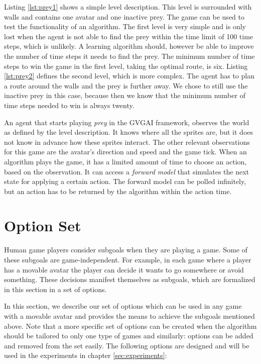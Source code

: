 Listing \ref{lst:prey1} shows a simple level description. This level is
surrounded with walls and contains one avatar and one inactive prey. 
The game can be used to test the functionality of an algorithm. The first level
is very simple and is only lost when the agent is not able to find the prey
within the time limit of 100 time steps, which is unlikely. A learning
algorithm should, however be able to improve the number of time steps it needs
to find the prey. The minimum number of time steps to win the game in the first
level, taking the optimal route, is six. Listing \ref{lst:prey2} defines the
second level, which is more complex. The agent has to plan a route around the
walls and the prey is further away. We chose to still use the inactive prey in
this case, because then we know that the minimum number of time steps needed to
win is always twenty.

An agent that starts playing \textit{prey} in the GVGAI framework, observes the
world as defined by the level description. It knows where all the sprites are,
but it does not know in advance how these sprites interact. The other relevant
observations for this game are the avatar's direction and speed and the game
tick. When an algorithm plays the game, it has a limited amount of time to
choose an action, based on the observation. It can access a \emph{forward
model} that simulates the next state for applying a certain action. The forward
model can be polled infinitely, but an action has to be returned by the
algorithm within the action time.

\section{Option Set}
Human game players consider subgoals when they are playing a game. Some of these
subgoals are game-independent. For example, in each game where a player has a
movable avatar the player can decide it wants to go somewhere or avoid
something. These decisions manifest themselves as subgoals, which are formalized
in this section in a set of options.  

In this section, we describe our set of options which can be used in any game
with a movable avatar and provides the means to achieve the subgoals mentioned
above. Note that a more specific set of options can be created when the
algorithm should be tailored to only one type of games and similarly: options
can be added and removed from the set easily. The following options are
designed and will be used in the experiments in chapter \ref{sec:experiments}:

